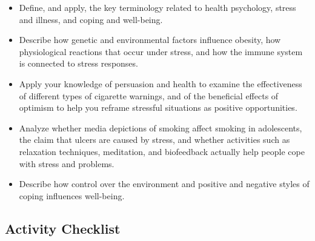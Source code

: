 \documentclass[
]{book}
\providecommand{\tightlist}{%
  \setlength{\itemsep}{0pt}\setlength{\parskip}{0pt}}
\begin{document}
\begin{itemize}
\tightlist
\item
  Define, and apply, the key terminology related to health psychology, stress and illness, and coping and well-being.\\
\item
  Describe how genetic and environmental factors influence obesity, how physiological reactions that occur under stress, and how the immune system is connected to stress responses.\\
\item
  Apply your knowledge of persuasion and health to examine the effectiveness of different types of cigarette warnings, and of the beneficial effects of optimism to help you reframe stressful situations as positive opportunities.\\
\item
  Analyze whether media depictions of smoking affect smoking in adolescents, the claim that ulcers are caused by stress, and whether activities such as relaxation techniques, meditation, and biofeedback actually help people cope with stress and problems.\\
\item
  Describe how control over the environment and positive and negative styles of coping influences well-being.
\end{itemize}

\hypertarget{activity-checklist-8}{%
\subsection*{Activity Checklist}\label{activity-checklist-8}}
\end{document}
